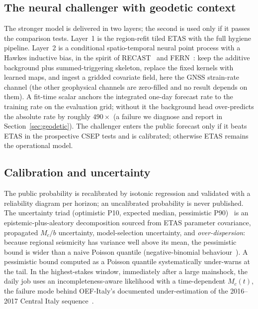 \documentclass[journal]{IEEEtran}
\begin{document}
\subsection{The neural challenger with geodetic context}

The stronger model is delivered in two layers; the second is used only if it passes the
comparison tests. Layer~1 is the
region-refit tiled ETAS with the full hygiene pipeline. Layer~2 is a conditional
spatio-temporal neural point process with a Hawkes inductive bias, in the spirit of
RECAST~\cite{dascher2023} and FERN~\cite{zlydenko2023}: keep the additive background plus
summed-triggering skeleton, replace the fixed kernels with learned maps, and ingest a
gridded covariate field, here the GNSS strain-rate channel (the other geophysical channels
are zero-filled and no result depends on them). A fit-time scalar anchors the integrated
one-day forecast rate to the training rate on the evaluation grid; without it the background
head over-predicts the absolute rate by roughly $490\times$ (a failure we diagnose and report
in Section~\ref{sec:geodetic}). The challenger enters the public forecast only if it beats
ETAS in the prospective CSEP tests and is calibrated; otherwise ETAS remains the
operational model.

\subsection{Calibration and uncertainty}

The public probability is recalibrated by isotonic regression and validated with a
reliability diagram per horizon; an uncalibrated probability is never published. The
uncertainty triad (optimistic P10, expected median, pessimistic P90)~\cite{schneider2022} is
an epistemic-plus-aleatory decomposition sourced from ETAS parameter covariance, propagated
$M_c/b$ uncertainty, model-selection uncertainty, and \emph{over-dispersion}: because
regional seismicity has variance well above its mean, the pessimistic bound is wider than a
naive Poisson quantile (negative-binomial behaviour~\cite{kagan2017}). A pessimistic bound
computed as a Poisson quantile systematically under-warns at the tail. In the
highest-stakes window, immediately after a large mainshock, the daily job
uses an incompleteness-aware likelihood with a time-dependent $M_c(t)$, the failure mode
behind OEF-Italy's documented under-estimation of the 2016--2017 Central Italy
sequence~\cite{spassiani2023}.

\end{document}
